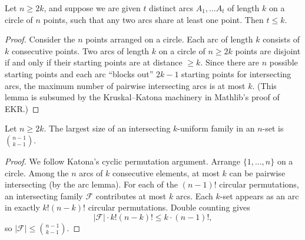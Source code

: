 \begin{lemma}
  \label{ch30lemma}
  Let $n \ge 2k$, and suppose we are given $t$ distinct arcs $A_1, \dots A_t$
  of length $k$ on a circle of $n$ points, such that any two arcs share at least one point. Then $t \le k$.
\end{lemma}
\begin{proof}
  Consider the $n$ points arranged on a circle. Each arc of length $k$ consists of $k$ consecutive points.
  Two arcs of length $k$ on a circle of $n \ge 2k$ points are disjoint if and only if their
  starting points are at distance $\ge k$. Since there are $n$ possible starting points and each
  arc ``blocks out'' $2k - 1$ starting points for intersecting arcs, the maximum number of
  pairwise intersecting arcs is at most $k$.
  (This lemma is subsumed by the Kruskal--Katona machinery in Mathlib's proof of EKR.)
\end{proof}

\begin{theorem}
  \label{ch30theorem2}
  \leanok
  Let $n \ge 2k$. The largest size of an intersecting $k$-uniform family in an $n$-set is $\binom{n - 1}{k - 1}$.
\end{theorem}
\begin{proof}
  \leanok
  We follow Katona's cyclic permutation argument. Arrange $\{1,\dots,n\}$ on a circle.
  Among the $n$ arcs of $k$ consecutive elements, at most $k$ can be pairwise intersecting
  (by the arc lemma). For each of the $(n-1)!$ circular permutations, an intersecting family
  $\mathcal{F}$ contributes at most $k$ arcs. Each $k$-set appears as an arc in exactly
  $k!(n-k)!$ circular permutations. Double counting gives
  \[
    |\mathcal{F}| \cdot k!(n-k)! \le k \cdot (n-1)!,
  \]
  so $|\mathcal{F}| \le \binom{n-1}{k-1}$.
\end{proof}


